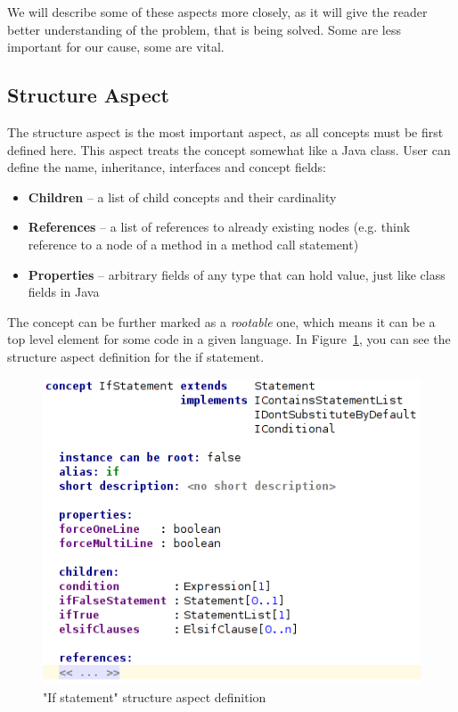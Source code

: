 We will describe some of these aspects more closely, as it will give the reader better understanding of the problem, that is being solved.
Some are less important for our cause, some are vital.

\subsection{Structure Aspect}

The structure aspect is the most important aspect, as all concepts must be first defined here.
This aspect treats the concept somewhat like a Java class.
User can define the name, inheritance, interfaces and concept fields:

\begin{itemize}
	\item \textbf{Children} -- a list of child concepts and their cardinality

	\item \textbf{References} -- a list of references to already existing nodes (e.g. think reference to a node of a method in a method call statement)

	\item \textbf{Properties} -- arbitrary fields of any type that can hold value, just like class fields in Java
\end{itemize}

The concept can be further marked as a \textit{rootable} one, which means it can be a top level element for some code in a given language.
In Figure~\ref{fig:if_statement_structure}, you can see the structure aspect definition for the if statement.

\begin{figure}[h]
	\centering
	\includegraphics[scale=0.75]{./img/if_statement_structure.png}
	\caption{"If statement" structure aspect definition}
	\label{fig:if_statement_structure}
\end{figure}

